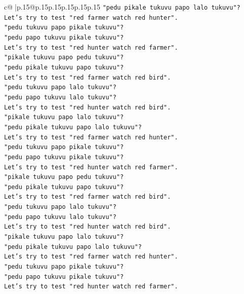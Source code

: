 \documentclass{article}
\begin{document}
{\begin{supertabular}{c@{$\;$}|p{.15\linewidth}@{}p{.15\linewidth}p{.15\linewidth}p{.15\linewidth}p{.15\linewidth}p{.15\linewidth}}
{{{\texttt{"pedu pikale tukuvu papo lalo tukuvu"?} \\
\texttt{Let's try to test "red farmer watch red hunter".} \\
\texttt{"pedu tukuvu papo pikale tukuvu"?} \\
\texttt{"pedu papo tukuvu pikale tukuvu"?} \\
\texttt{Let's try to test "red hunter watch red farmer".} \\
\texttt{"pikale tukuvu papo pedu tukuvu"?} \\
\texttt{"pedu pikale tukuvu papo tukuvu"?} \\
\texttt{Let's try to test "red farmer watch red bird".} \\
\texttt{"pedu tukuvu papo lalo tukuvu"?} \\
\texttt{"pedu papo tukuvu lalo tukuvu"?} \\
\texttt{Let's try to test "red hunter watch red bird".} \\
\texttt{"pikale tukuvu papo lalo tukuvu"?} \\
\texttt{"pedu pikale tukuvu papo lalo tukuvu"?} \\
\texttt{Let's try to test "red farmer watch red hunter".} \\
\texttt{"pedu tukuvu papo pikale tukuvu"?} \\
\texttt{"pedu papo tukuvu pikale tukuvu"?} \\
\texttt{Let's try to test "red hunter watch red farmer".} \\
\texttt{"pikale tukuvu papo pedu tukuvu"?} \\
\texttt{"pedu pikale tukuvu papo tukuvu"?} \\
\texttt{Let's try to test "red farmer watch red bird".} \\
\texttt{"pedu tukuvu papo lalo tukuvu"?} \\
\texttt{"pedu papo tukuvu lalo tukuvu"?} \\
\texttt{Let's try to test "red hunter watch red bird".} \\
\texttt{"pikale tukuvu papo lalo tukuvu"?} \\
\texttt{"pedu pikale tukuvu papo lalo tukuvu"?} \\
\texttt{Let's try to test "red farmer watch red hunter".} \\
\texttt{"pedu tukuvu papo pikale tukuvu"?} \\
\texttt{"pedu papo tukuvu pikale tukuvu"?} \\
\texttt{Let's try to test "red hunter watch red farmer".} \\
}}}
\end{supertabular}}
\end{document}
